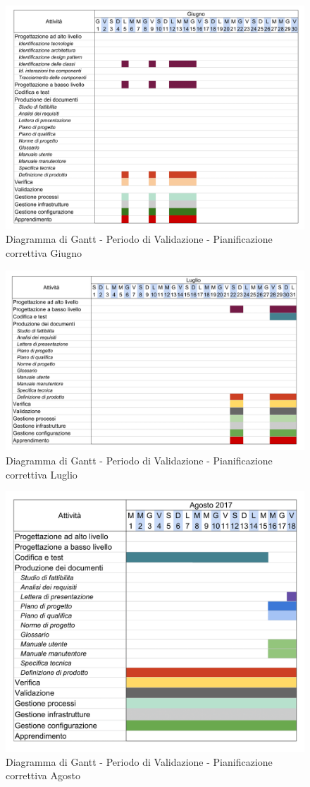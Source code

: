 			\newpage
			\begin{figure}[H]
				\centering
				\includegraphics[width=\textwidth]{img/Gantt/FiGiugno.png}
				\caption{Diagramma di Gantt - Periodo di Validazione - Pianificazione correttiva Giugno}
			\end{figure}			\newpage
			\begin{figure}[H]
				\centering
				\includegraphics[width=\textwidth]{img/Gantt/FiLuglio.png}
				\caption{Diagramma di Gantt - Periodo di Validazione - Pianificazione correttiva Luglio}
			\end{figure}
			\newpage
			\begin{figure}[H]
				\centering
				\includegraphics[width=\textwidth]{img/Gantt/FiAgosto.png}
				\caption{Diagramma di Gantt - Periodo di Validazione - Pianificazione correttiva Agosto}
			\end{figure}
